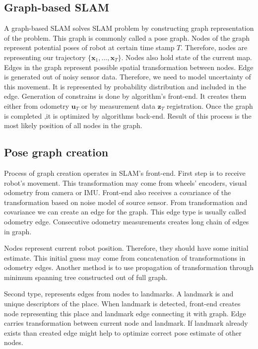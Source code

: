\subsection{Graph-based SLAM}
A graph-based SLAM solves SLAM problem by constructing graph representation of the problem. This graph is commonly called a pose graph. Nodes of the graph represent potential poses of robot at certain time stamp $ T $. Therefore, nodes are representing our trajectory $ \{\textbf{x}_{1},...,\textbf{x}_{T}\} $. Nodes also hold state of the current map. Edges in the graph represent possible spatial transformation between nodes. Edge is generated out of noisy sensor data. Therefore, we need to model uncertainty of this movement. It is represented by probability distribution and included in the edge. Generation of constrains is done by algorithm's front-end. It creates them either from odometry $  \textbf{u}_{T} $ or by measurement data  $ \textbf{z}_{T} $ registration. Once the graph is completed ,it is optimized by algorithms back-end. Result of this process is the most likely position of all nodes in the graph.

\subsection {Pose graph creation}
\label{Pose_graph_creation}
Process of graph creation operates in \gls{SLAM}'s front-end. First step is to receive robot's movement. This transformation may come from wheels' encoders, visual odometry from camera or \gls{IMU}. Front-end also receives a covariance of the transformation based on noise model of source sensor. From transformation and covariance we can create an edge for the graph. This edge type is usually called odometry edge. Consecutive odometry measurements creates long chain of edges in graph.

Nodes represent current robot position. Therefore, they should have some initial estimate. This initial guess may come from concatenation of transformations in odometry edges. Another method is to use propagation of transformation through minimum spanning tree constructed out of full graph. 

Second type, represents edges from nodes to landmarks. A landmark is and unique descriptors of the place. When landmark is detected, front-end creates node representing this place and landmark edge connecting it with graph. Edge carries transformation between current node and landmark. If landmark already exists than created edge might help to optimize correct pose estimate of other nodes.

